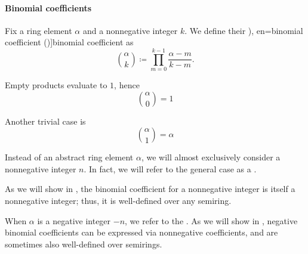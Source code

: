 \paragraph{Binomial coefficients}

\begin{definition}\label{def:binomial_coefficient}\mimprovised
  Fix a ring element \( \alpha \) and a nonnegative integer \( k \). We define their \term[ru=биномиальный коеффициент (\cite[100]{БелоусовТкачёв2004ДискретнаяМатематика}), en=binomial coefficient (\cite[53]{Knuth1997ArtVol1})]{binomial coefficient} as
  \begin{equation}\label{eq:def:binomial_coefficient}
    \binom \alpha k \coloneqq \prod_{m=0}^{k - 1} \frac {\alpha - m} {k - m}.
  \end{equation}

  \begin{paracol}{2}
    \begin{leftcolumn}
      Empty products evaluate to \( 1 \), hence
      \begin{equation}\label{eq:def:binomial_coefficient/zero}
        \binom \alpha 0 = 1
      \end{equation}
    \end{leftcolumn}

    \begin{rightcolumn}
      Another trivial case is
      \begin{equation}\label{eq:def:binomial_coefficient/one}
        \binom \alpha 1 = \alpha
      \end{equation}
    \end{rightcolumn}
  \end{paracol}

  Instead of an abstract ring element \( \alpha \), we will almost exclusively consider a nonnegative integer \( n \). In fact, we will refer to the general case as a .

  As we will show in , the binomial coefficient for a nonnegative integer is itself a nonnegative integer; thus, it is well-defined over any semiring.

  When \( \alpha \) is a negative integer \( -n \), we refer to the . As we will show in , negative binomial coefficients can be expressed via nonnegative coefficients, and are sometimes also well-defined over semirings.
\end{definition}
